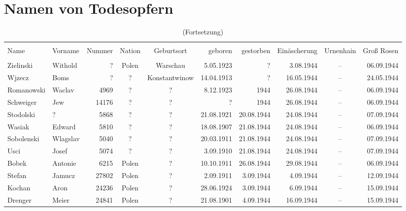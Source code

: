 \thispagestyle{empty}

\chapter{Namen von Todesopfern}
\vspace{-20pt}
\begin{tiny}\begin{longtable}[l]{|l|l|r|c|c|r|r|r|c|r|}
  \endfirsthead\pagebreak[20]\caption[]{(Fortsetzung)}\\[3pt]\endhead\endfoot
  
\hline  & \\[-9pt]
Name  &  Vorname  &  Nummer  &  Nation  &  Geburtsort  &  geboren  &  gestorben  &  Ein\-äscherung  &  Urnenhain  & Groß Rosen\\[3pt]
  \hline
 & \\[-9pt]
Zielinski  &  Withold  &  ?  &  Polen  &  Warschau  & 5.05.1923 & ?  & 3.08.1944 &  --  &  06.09.1944 \\[3pt]
Wjzecz  &  Boms  &  ?  &  ?  &  Konstantwinow  & 14.04.1913 & ?  & 16.05.1944 &  --  &  24.05.1944 \\[3pt]
Romanowski  &  Waclav  & 4969 &  ?  &  ?  & 8.12.1923 & 1944 & 26.08.1944 &  --  &  06.09.1944 \\[3pt]
Schweiger  &  Jew  & 14176 &  ?  &  ?  & ?  & 1944 & 26.08.1944 &  --  &  06.09.1944 \\[3pt]
Stodolski  &  ?  & 5868 &  ?  &  ?  & 21.08.1921 & 20.08.1944 & 24.08.1944 &  --  &  07.09.1944 \\[3pt]
Wasiak  &  Edward  & 5810 &  ?  &  ?  & 18.08.1907 & 21.08.1944 & 24.08.1944 &  --  &  06.09.1944 \\[3pt]
Sobolenski  &  Wlagslav  & 5040 &  ?  &  ?  & 20.03.1911 & 21.08.1944 & 24.08.1944 &  --  &  07.09.1944 \\[3pt]
Usci  &  Josef  & 5074 &  ?  &  ?  & 3.09.1910 & 21.08.1944 & 24.08.1944 &  --  &  07.09.1944 \\[3pt]
Bobek  &  Antonie  & 6215 &  Polen  &  ?  & 10.10.1911 & 26.08.1944 & 29.08.1944 &  --  &  06.09.1944 \\[3pt]
Stefan  &  Jamucz  & 27802 &  Polen  &  ?  & 2.09.1911 & 3.09.1944 & 4.09.1944 &  --  &  12.09.1944 \\[3pt]
Kochan  &  Aron  & 24236 &  Polen  &  ?  & 28.06.1924 & 3.09.1944 & 6.09.1944 &  --  &  15.09.1944 \\[3pt]
Drenger  &  Meier  & 24841 &  Polen  &  ?  & 21.08.1901 & 4.09.1944 & 16.09.1944 &  --  &  15.09.1944 \\[3pt]

\end{longtable}
\end{tiny}
